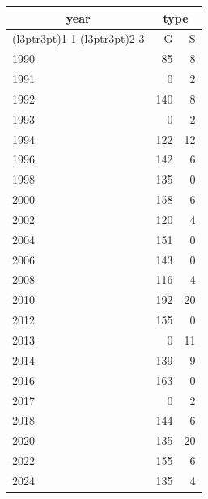 \footnotesize\begin{tabular}[t]{lrr}
\toprule
\multicolumn{1}{c}{year} & \multicolumn{2}{c}{type} \\
\cmidrule(l{3pt}r{3pt}){1-1} \cmidrule(l{3pt}r{3pt}){2-3}
  & G & S\\
\midrule
1990 & 85 & 8\\
1991 & 0 & 2\\
1992 & 140 & 8\\
1993 & 0 & 2\\
1994 & 122 & 12\\
1996 & 142 & 6\\
1998 & 135 & 0\\
2000 & 158 & 6\\
2002 & 120 & 4\\
2004 & 151 & 0\\
2006 & 143 & 0\\
2008 & 116 & 4\\
2010 & 192 & 20\\
2012 & 155 & 0\\
2013 & 0 & 11\\
2014 & 139 & 9\\
2016 & 163 & 0\\
2017 & 0 & 2\\
2018 & 144 & 6\\
2020 & 135 & 20\\
2022 & 155 & 6\\
2024 & 135 & 4\\
\bottomrule
\end{tabular}
